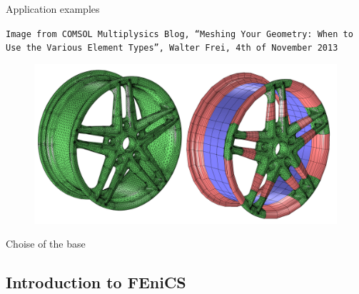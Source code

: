 \begin{frame}{Application examples}
\begin{minipage}{0.425\textwidth}
      \tiny{\texttt{Image from COMSOL Multiplysics Blog, ``Meshing Your Geometry: When to Use the Various Element Types'', Walter Frei, 4th of November 2013}}
   \end{minipage}
   \hfill
   \begin{minipage}{0.5\textwidth}
      \begin{figure}[H]
         \raggedleft
         \includegraphics[width=\textwidth]{Immagini/mesh-application-2.png}
      \end{figure}
   \end{minipage}
\end{frame}

\begin{frame}{Choise of the base}
   
\end{frame}

\subsection{Introduction to FEniCS}


